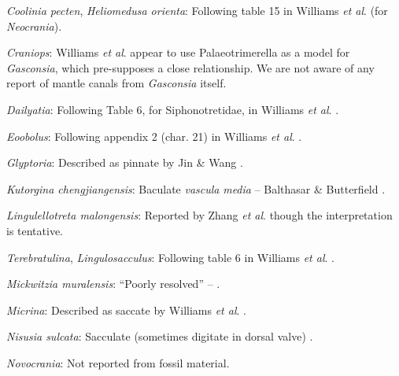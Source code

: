 \documentclass[openany]{book}
\theoremstyle{definition}
\theoremstyle{definition}
\theoremstyle{definition}
\theoremstyle{remark}
\begin{document}
\hypertarget{Coolinia_pecten-coding-31}{}
\emph{Coolinia pecten}, \emph{Heliomedusa orienta}: Following table 15
in Williams \emph{et al}.
\citeyearpar{Williams2000LinguliformeaCraniiformea} (for
\emph{Neocrania}).

\hypertarget{Craniops-coding-31}{}
\emph{Craniops}: Williams \emph{et al}. \citeyearpar[table
15]{Williams2000LinguliformeaCraniiformea} appear to use
Palaeotrimerella \citep[as drawn in][]{Williams1997Introduction} as a
model for \emph{Gasconsia}, which pre-supposes a close relationship. We
are not aware of any report of mantle canals from \emph{Gasconsia}
itself.

\hypertarget{Dailyatia-coding-31}{}
\emph{Dailyatia}: Following Table 6, for Siphonotretidae, in Williams
\emph{et al}. \citeyearpar{Williams2000LinguliformeaCraniiformea}.

\hypertarget{Eoobolus-coding-31}{}
\emph{Eoobolus}: Following appendix 2 (char. 21) in Williams \emph{et
al}. \citeyearpar{Williams1998Thediversity}.

\hypertarget{Glyptoria-coding-31}{}
\emph{Glyptoria}: Described as pinnate by Jin \& Wang
\citeyearpar{Jin1992Revisionof}.

\hypertarget{Kutorgina_chengjiangensis-coding-31}{}
\emph{Kutorgina chengjiangensis}: Baculate \emph{vascula} \emph{media}
-- Balthasar \& Butterfield \citeyearpar{Balthasar2009EarlyCambrian}.

\hypertarget{Lingulellotreta_malongensis-coding-31}{}
\emph{Lingulellotreta malongensis}: Reported by Zhang \emph{et al}.
\citeyearpar[2011T]{Zhang2007Agregarious} though the interpretation is
tentative.

\hypertarget{Lingulosacculus-coding-31}{}
\emph{Terebratulina}, \emph{Lingulosacculus}: Following table 6 in
Williams \emph{et al}.
\citeyearpar{Williams2000LinguliformeaCraniiformea}.

\hypertarget{Mickwitzia_muralensis-coding-31}{}
\emph{Mickwitzia muralensis}: ``Poorly resolved'' --
\citet{Balthasar2008iMummpikia}.

\hypertarget{Micrina-coding-31}{}
\emph{Micrina}: Described as saccate by Williams \emph{et al}.
\citeyearpar{Williams1998Thediversity}.

\hypertarget{Nisusia_sulcata-coding-31}{}
\emph{Nisusia sulcata}: Sacculate (sometimes digitate in dorsal valve)
\citep[p716]{Williams2000LinguliformeaCraniiformea}.

\hypertarget{Novocrania-coding-31}{}
\emph{Novocrania}: Not reported from fossil material.
\end{document}
